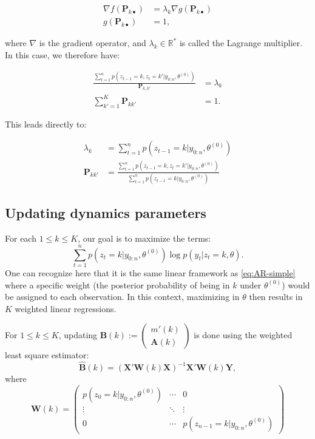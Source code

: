 \documentclass[]{book}
\begin{document}
\begin{align*}
\nabla f(\mathbf{P}_{k\bullet}) &= \lambda_k \nabla g(\mathbf{P}_{k\bullet})\\
g(\mathbf{P}_{k\bullet}) &= 1,
\end{align*}

where \(\nabla\) is the gradient operator, and
\(\lambda_k \in \mathbb{R}^*\) is called the Lagrange multiplier. In
this case, we therefore have:

\begin{align*}
\frac{\sum_{t = 1}^n p(z_{t-1} = k, z_{t} = k'\vert y_{0:n}, \theta^{(0)})}{\mathbf{P}_{k,k'}} &= \lambda_k \\
\sum_{k' = 1}^K{\mathbf{P}_{kk'}} &= 1.
\end{align*}

This leads directly to:

\begin{align*}
\lambda_k &= \sum_{t = 1}^n p(z_{t - 1} = k \vert y_{0:n}, \theta^{(0)}) \\
\mathbf{P}_{kk'} &= \frac{\sum_{t = 1}^n p(z_{t - 1} = k, z_{t} = k'\vert y_{0:n}, \theta^{(0)}) }{\sum_{t = 1}^n p(z_{t - 1} = k \vert y_{0:n}, \theta^{(0)})}
\end{align*}

\subsection*{Updating dynamics
parameters}\label{updating-dynamics-parameters}

For each \(1\leq k \leq K\), our goal is to maximize the terms:
\[\sum_{t = 1}^n p(z_t = k\vert y_{0:n}, \theta^{(0)}) \log p(y_{t} \vert z_{t} = k, \theta).\]
One can recognize here that it is the same linear framework as
\eqref{eq:AR-simple} where a specific weight (the posterior probability of
being in \(k\) under \(\theta^{(0)}\)) would be assigned to each
observation. In this context, maximizing in \(\theta\) then results in
\(K\) weighted linear regressions.

For \(1 \leq k\leq K\), updating
\(\mathbf{B}(k) := \begin{pmatrix} m'(k)\\ \mathbf{A}(k) \end{pmatrix}\)
is done using the weighted least square estimator:
\[\widehat{\mathbf{B}}(k) = \left(\mathbf{X}'\mathbf{W}(k)\mathbf{X} \right)^{-1} \mathbf{X}'\mathbf{W}(k) \mathbf{Y},\]
where
\[\mathbf{W}(k) = \begin{pmatrix}p(z_0 = k\vert y_{0:n}, \theta^{(0)}) & \cdots & 0 \\
\vdots & \ddots & \vdots\\
0 & \cdots & p(z_{n-1} = k\vert y_{0:n}, \theta^{(0)})
\end{pmatrix}\]


\end{document}
